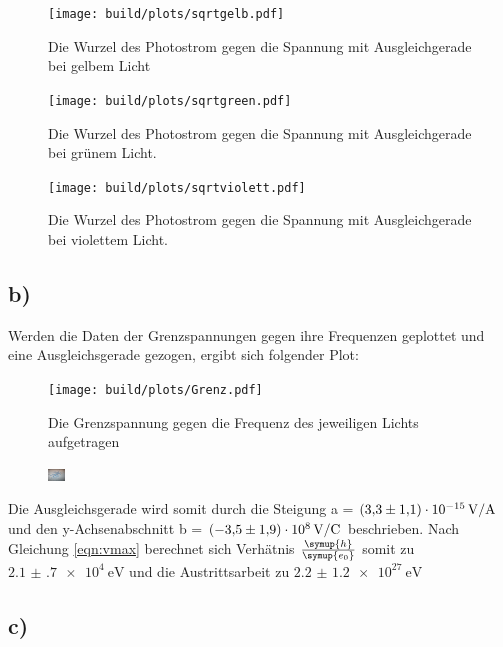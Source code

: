 \begin{figure}[H]
    \centering
    \texttt{[image: build/plots/sqrtgelb.pdf]}
    \caption{Die Wurzel des Photostrom gegen die Spannung mit Ausgleichgerade bei gelbem Licht}
    \label{img:sqrtgelb}
\end{figure}

\begin{figure}[H]
    \centering
    \texttt{[image: build/plots/sqrtgreen.pdf]}
    \caption{Die Wurzel des Photostrom gegen die Spannung mit Ausgleichgerade bei grünem Licht.}
    \label{img:sqrtgruen}
\end{figure}

\begin{figure}[H]
    \centering
    \texttt{[image: build/plots/sqrtviolett.pdf]}
    \caption{Die Wurzel des Photostrom gegen die Spannung mit Ausgleichgerade bei violettem Licht.}
    \label{img:sqrtviolett}
\end{figure}

    \subsection{b)}

Werden die Daten der Grenzspannungen gegen ihre Frequenzen geplottet und eine Ausgleichsgerade gezogen, ergibt sich folgender Plot:


\begin{figure}[H]
    \centering
    \texttt{[image: build/plots/Grenz.pdf]}
    \caption{Die Grenzspannung gegen die Frequenz des jeweiligen Lichts aufgetragen}
    \label{img:gegen}
\end{figure}

\begin{figure}[H]
    \centering
    \includegraphics[width=0.04\textwidth]{latex/images/meme.PNG}
\end{figure}
\noindent
Die Ausgleichsgerade wird somit durch die Steigung a = $\SI{3.3 (11)e-15}{\volt\per\ampere}$ und den y-Achsenabschnitt 
b = $\SI{-3.5 (19)e8}{\volt\per\coulomb}$ beschrieben.
Nach Gleichung \ref{eqn:vmax} berechnet sich Verhätnis $\frac{\symup{h}}{\symup{e_0}}$ somit zu $\SI{2.1(7)e4}{\electronvolt}$ und die 
Austrittsarbeit zu $\SI{2.2(12)e27}{\electronvolt}$

    \subsection{c)}

